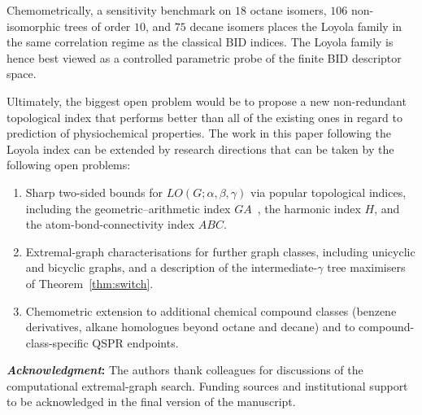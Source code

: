 \documentclass[a5paper, 10pt]{article}
\theoremstyle{plain}
\theoremstyle{remark}
\theoremstyle{definition}
\newcommand{\acknowledgment}[1]{\vspace{5mm}\singlespacing
    {\noindent\textbf{\textit{Acknowledgment\/}:} #1}
}
\newcommand{\Wuzi}{LO(G;\alpha,\beta,\gamma)}
\begin{document}
Chemometrically, a sensitivity benchmark on $18$ octane isomers, $106$
non-isomorphic trees of order $10$, and $75$ decane isomers
places the Loyola family in the same correlation regime as the
classical BID indices. The Loyola family is hence best viewed as a controlled
parametric probe of the finite BID descriptor space.

Ultimately, the biggest open problem would be to propose a new non-redundant topological index that performs better than all of the existing ones in regard to prediction of physiochemical properties. The work in this paper following the Loyola index can be extended by research directions that can be taken by the following open problems:
\begin{enumerate}
\item Sharp two-sided bounds for $\Wuzi$ via popular topological indices, including the
geometric--arithmetic index
$GA$~\cite{VukicevicFurtula2009GA}, the harmonic index $H$, and
the atom-bond-connectivity index $ABC$.


\item Extremal-graph characterisations for further graph classes, including unicyclic and
bicyclic graphs, and a description of the intermediate-$\gamma$ tree maximisers of Theorem~\ref{thm:switch}.

\item Chemometric extension to additional chemical compound classes
(benzene derivatives, alkane homologues beyond octane and
decane) and to compound-class-specific QSPR endpoints.
\end{enumerate}

\acknowledgment{The authors thank colleagues for discussions of
the computational extremal-graph search. Funding sources and institutional
support to be acknowledged in the final version of the
manuscript.}

\singlespacing
\end{document}

